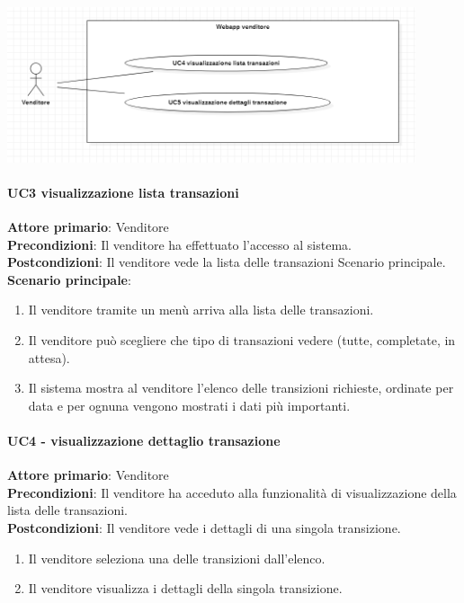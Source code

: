 \documentclass[a4paper, 12pt]{article}
\begin{document}
\includegraphics[width=0.9\textwidth]{UseCase_venditore3.png}

\paragraph{UC3 visualizzazione lista transazioni}
\textbf{Attore primario}: Venditore \\
\textbf{Precondizioni}: Il venditore ha effettuato l'accesso al sistema.\\
\textbf{Postcondizioni}:  Il venditore vede la lista delle transazioni
Scenario principale.\\
\textbf{Scenario principale}:
\begin{enumerate}
\item Il venditore tramite un menù arriva alla lista delle transazioni.
\item Il venditore può scegliere che tipo di transazioni vedere (tutte, completate, in attesa).
\item Il sistema mostra al venditore l'elenco delle transizioni richieste, ordinate per data e per ognuna vengono mostrati i dati più importanti.
\end{enumerate}

\paragraph{UC4 - visualizzazione dettaglio transazione}
\textbf{Attore primario}: Venditore\\
\textbf{Precondizioni}: Il venditore ha acceduto alla funzionalità di visualizzazione della lista delle transazioni.\\
\textbf{Postcondizioni}: Il venditore vede i dettagli di una singola transizione.\\
\begin{enumerate}
\item Il venditore seleziona una delle transizioni dall'elenco.
\item Il venditore visualizza i dettagli della singola transizione.
\end{enumerate}
\end{document}
